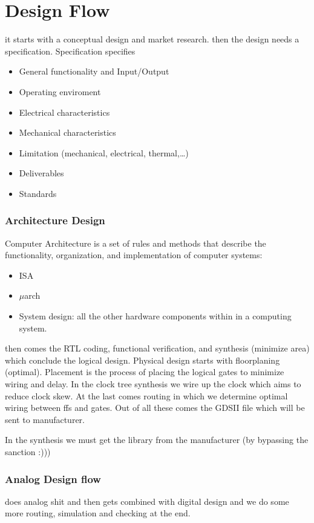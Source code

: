 \chapter{Design Flow}
it starts with a conceptual design and market research. then the design needs a specification. Specification specifies
\begin{itemize}
    \item General functionality and Input/Output
    \item Operating enviroment
    \item Electrical characteristics
    \item Mechanical characteristics
    \item Limitation (mechanical, electrical, thermal,\dots)
    \item Deliverables
    \item Standards
\end{itemize}
\subsection{Architecture Design}
Computer Architecture is a set of rules and methods that describe the functionality, organization, and implementation of computer systems:
\begin{itemize}
    \item ISA
    \item \(\mu\)arch
    \item System design: all the other hardware components within in a computing system.
\end{itemize}

then comes the RTL coding, functional verification, and synthesis (minimize area) which conclude the logical design. Physical design starts with floorplaning (optimal). Placement is the process of placing the logical gates to minimize wiring and delay. In the clock tree synthesis we wire up the clock which aims to reduce clock skew. At the last comes routing in which we determine optimal wiring between ffs and gates. Out of all these comes the GDSII file which will be sent to manufacturer.

In the synthesis we must get the library from the manufacturer (by bypassing the sanction :)))

\subsection{Analog Design flow}
does analog shit and then gets combined with digital design and we do some more routing, simulation and checking at the end.